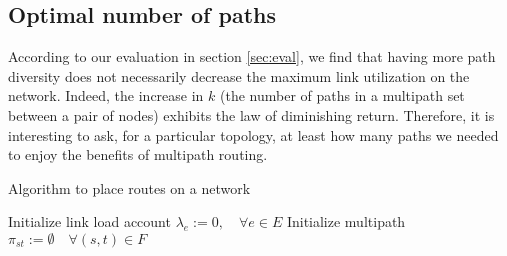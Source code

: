 \documentclass[conference]{IEEEtran}
\begin{document}
\subsection{Optimal number of paths}\label{sub:optimalk}

According to our evaluation in section \ref{sec:eval}, we find that having more
path diversity does not necessarily decrease the maximum link utilization on
the network. Indeed, the increase in $k$ (the number of paths in a multipath
set between a pair of nodes) exhibits the law of diminishing return. Therefore,
it is interesting to ask, for a particular topology, at least how many paths we
needed to enjoy the benefits of multipath routing.

\begin{algorithm}
\caption{Algorithm to place routes on a network}\label{alg:3}
Initialize link load account $\lambda_e :=0,\quad\forall e\in E$\;
Initialize multipath $\pi_{st}:=\emptyset\quad\forall (s,t)\in F$\;
\end{algorithm}
\end{document}
